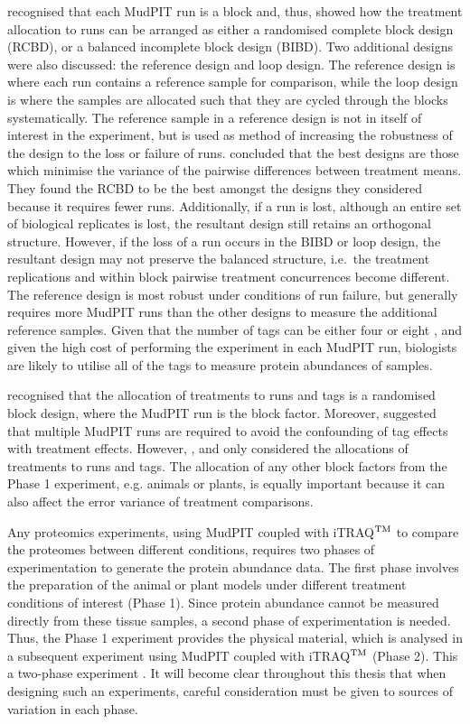 \cite{Oberg2009} recognised that each MudPIT run is a block and, thus, showed how the treatment allocation to runs can be arranged as either a randomised complete block design (RCBD), or a balanced incomplete block design (BIBD). Two additional designs were also discussed: the reference design and loop design. The reference design is where each run contains a reference sample for comparison, while the loop design is where the samples are allocated such that they are cycled through the blocks systematically. The reference sample in a reference design is not in itself of interest in the experiment, but is used as method of increasing the robustness of the design to the loss or failure of runs. \cite{Oberg2009} concluded that the best designs are those which minimise the variance of the pairwise differences between treatment means. They found the RCBD to be the best amongst the designs they considered because it requires fewer runs. Additionally, if a run is lost, although an entire set of biological replicates is lost, the resultant design still retains an orthogonal structure. However, if the loss of a run occurs in the BIBD or loop design, the resultant design may not preserve the balanced structure, i.e.\ the treatment replications and within block pairwise treatment concurrences become different. The reference design is most robust under conditions of run failure, but generally requires more MudPIT runs than the other designs to measure the additional reference samples. Given that the number of tags can be either four \citep{Ross2004} or eight \citep{Choe2007}, and given the high cost of performing the experiment in each MudPIT run, biologists are likely to utilise all of the tags to measure protein abundances of samples.

\cite{Oberg2012} recognised that the allocation of treatments to runs and tags is a randomised block design, where the MudPIT run is the block factor. Moreover, \cite{Oberg2012} suggested that multiple MudPIT runs are required to avoid the confounding of tag effects with treatment effects. However, \cite{Oberg2009}, and \cite{Oberg2012} only considered the allocations of treatments to runs and tags. The allocation of any other block factors from the Phase 1 experiment, e.g. animals or plants, is equally important because it can also affect the error variance of treatment comparisons. 

Any proteomics experiments, using MudPIT coupled with iTRAQ$^{\rm TM}$ to compare the proteomes between different conditions, requires two phases of experimentation to generate the protein abundance data. The first phase involves the preparation of the animal or plant models under different treatment conditions of interest (Phase 1). Since protein abundance cannot be measured directly from these tissue samples, a second phase of experimentation is needed. Thus, the Phase 1 experiment provides the physical material, which is analysed in a subsequent experiment using MudPIT coupled with iTRAQ$^{\rm TM}$ (Phase 2). This a two-phase experiment \citep{Jarrett2008}. It will become clear throughout this thesis that when designing such an experiments, careful consideration must be given to sources of variation in each phase.   
 
